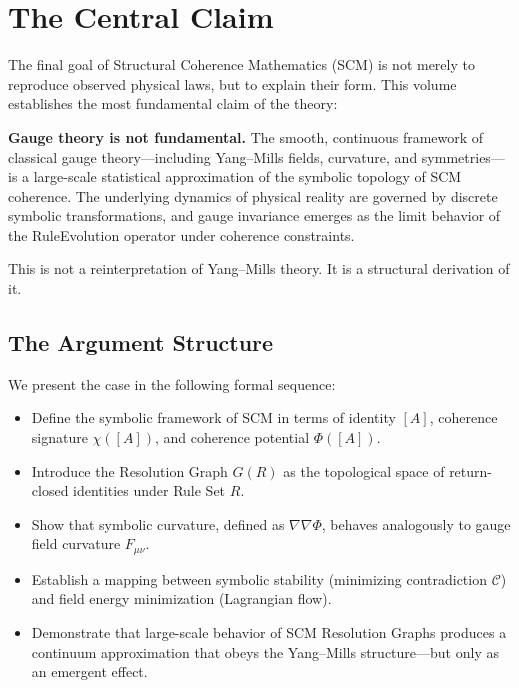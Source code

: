 \chapter{The Central Claim} \label{chapter-central-claim}

The final goal of Structural Coherence Mathematics (SCM) is not merely to reproduce observed physical laws, but to explain their form. This volume establishes the most fundamental claim of the theory:

\begin{definition}
\textbf{Gauge theory is not fundamental.} The smooth, continuous framework of classical gauge theory---including Yang--Mills fields, curvature, and symmetries---is a large-scale statistical approximation of the symbolic topology of SCM coherence. The underlying dynamics of physical reality are governed by discrete symbolic transformations, and gauge invariance emerges as the limit behavior of the RuleEvolution operator under coherence constraints.
\end{definition}

This is not a reinterpretation of Yang--Mills theory. It is a structural derivation of it.

\section{The Argument Structure}

We present the case in the following formal sequence:

\begin{itemize}
    \item Define the symbolic framework of SCM in terms of identity $[A]$, coherence signature $\chi([A])$, and coherence potential $\Phi([A])$.
    \item Introduce the Resolution Graph $G(R)$ as the topological space of return-closed identities under Rule Set $R$.
    \item Show that symbolic curvature, defined as $\nabla\nabla \Phi$, behaves analogously to gauge field curvature $F_{\mu\nu}$.
    \item Establish a mapping between symbolic stability (minimizing contradiction $\mathcal{C}$) and field energy minimization (Lagrangian flow).
    \item Demonstrate that large-scale behavior of SCM Resolution Graphs produces a continuum approximation that obeys the Yang--Mills structure---but only as an emergent effect.
\end{itemize}

